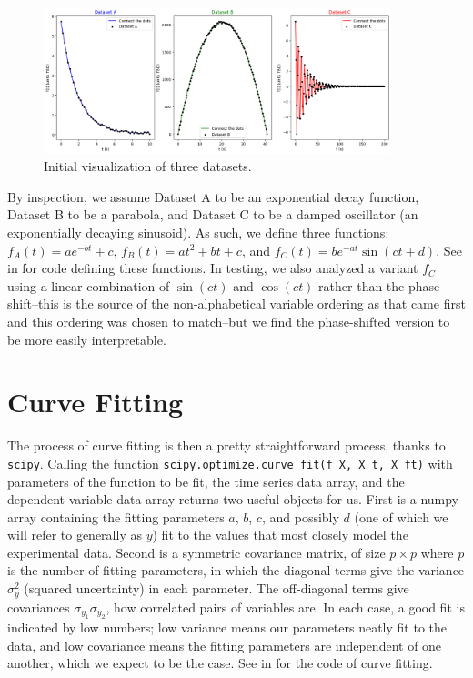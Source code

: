 \documentclass{article}
\begin{document}
\begin{figure}[ht]
    \centering

    \includegraphics[width=0.9\textwidth]{../figures/init.png}

    \caption{Initial visualization of three datasets.}

    \label{fig:init}
\end{figure}

By inspection, we assume Dataset A to be an exponential decay function, Dataset B to be a parabola,
and Dataset C to be a damped oscillator (an exponentially decaying sinusoid). As such, we define three
functions: $f_A(t) = ae^{-bt} + c$, $f_B(t) = at^2 + bt + c$, and $f_C(t) = be^{-at}\sin(ct + d)$.
See  in  for code defining these functions.
In testing, we also analyzed a variant $f_C$ using a linear combination of $\sin(ct)$ and $\cos(ct)$ rather
than the phase shift--this is the source of the non-alphabetical variable ordering as that came
first and this ordering was chosen to match--but we find the phase-shifted 
version to be more easily interpretable. 

\section{Curve Fitting}

The process of curve fitting is then a pretty straightforward process, thanks to \verb|scipy|. Calling
the function \verb|scipy.optimize.curve_fit(f_X, X_t, X_ft)| with parameters of the function
to be fit, the time series data array, and the dependent variable data array returns two useful objects
for us. First is a numpy array containing the fitting parameters $a$, $b$, $c$, and possibly $d$ 
(one of which we will refer to generally as $y$) fit to the values that most closely model the experimental 
data. Second is a symmetric covariance matrix, of size $p \times p$ where $p$ is the number of fitting parameters, 
in which the diagonal terms give the variance $\sigma_y^2$ (squared uncertainty) in each parameter. The 
off-diagonal terms give covariances $\sigma_{y_1}\sigma_{y_2}$, how correlated pairs of variables are. 
In each case, a good fit is indicated by low numbers; low variance means our parameters neatly fit to the data, 
and low covariance means the fitting parameters are independent of one another, which we expect to be the case.
See  in  for the code of curve fitting.
\end{document}
